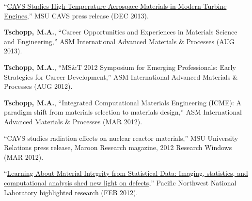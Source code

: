 \begin{cvlist}
\item
``\href{https://www.cavs.msstate.edu/story.php?d=387}{CAVS Studies High Temperature Aerospace Materials in Modern Turbine Engines},'' MSU CAVS press release (DEC 2013).

\item
\textbf{Tschopp, M.A.}, ``{Career Opportunities and Experiences in Materials Science and Engineering},'' ASM International Advanced Materials \& Processes (AUG 2013).

\item
\textbf{Tschopp, M.A.}, ``{MS\&T 2012 Symposium for Emerging Professionals: Early Strategies for Career Development},'' ASM International Advanced Materials \& Processes (AUG 2012).

\item
\textbf{Tschopp, M.A.}, ``{Integrated Computational Materials Engineering (ICME): A paradigm shift from materials selection to materials design},'' ASM International Advanced Materials \& Processes (MAR 2012).

\item
``CAVS studies radiation effects on nuclear reactor materials,'' MSU University Relations press release, Maroon Research magazine, 2012 Research Windows (MAR 2012).

\item
``\href{http://www.pnnl.gov/science/highlights/highlight.asp?id=1115}{Learning About Material Integrity from Statistical Data: Imaging, statistics, and computational analysis shed new light on defects},'' Pacific Northwest National Laboratory highlighted research (FEB 2012).

\end{cvlist}

